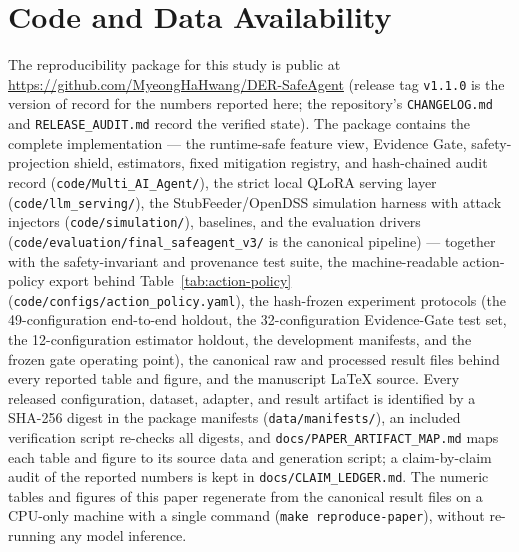 \section*{Code and Data Availability}
\begingroup\sloppy
The reproducibility package for this study is public at
\url{https://github.com/MyeongHaHwang/DER-SafeAgent} (release tag
\texttt{v1.1.0} is the version of record for the numbers reported here; the
repository's \texttt{CHANGELOG.md} and \texttt{RELEASE\_AUDIT.md} record the
verified state). The package contains the complete \ours{} implementation
--- the runtime-safe feature view, Evidence Gate, safety-projection shield,
estimators, fixed mitigation registry, and hash-chained audit record
(\texttt{code/Multi\_AI\_Agent/}), the strict local QLoRA serving layer
(\texttt{code/llm\_serving/}), the StubFeeder/OpenDSS simulation harness
with attack injectors (\texttt{code/simulation/}), baselines, and the
evaluation drivers (\texttt{code/evaluation/final\_safeagent\_v3/} is the
canonical pipeline) --- together with the safety-invariant and provenance
test suite, the machine-readable action-policy export behind
Table~\ref{tab:action-policy} (\texttt{code/configs/action\_policy.yaml}),
the hash-frozen experiment protocols (the 49-configuration end-to-end
holdout, the 32-configuration Evidence-Gate test set, the 12-configuration
estimator holdout, the development manifests, and the frozen gate operating
point), the canonical raw and processed result files behind every reported
table and figure, and the manuscript LaTeX source. Every released
configuration, dataset, adapter, and result artifact is identified by a
SHA-256 digest in the package manifests
(\texttt{data/manifests/}), an included verification script re-checks all
digests, and \texttt{docs/PAPER\_ARTIFACT\_MAP.md} maps each table and
figure to its source data and generation script; a claim-by-claim audit of
the reported numbers is kept in \texttt{docs/CLAIM\_LEDGER.md}. The numeric
tables and figures of this paper regenerate from the canonical result files
on a CPU-only machine with a single command (\texttt{make reproduce-paper}),
without re-running any model inference.

